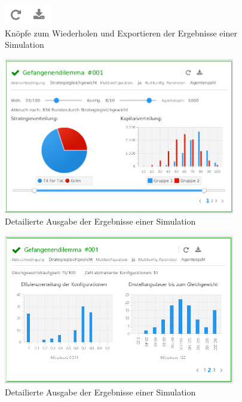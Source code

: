 \documentclass[parskip=full,11pt]{scrartcl}
\begin{document}
\begin{figure}[ht]
	\centering
	\includegraphics{images/out_btn.png}
	\caption{\label{fig:out_btn}
		Knöpfe zum Wiederholen und Exportieren der Ergebnisse einer Simulation}
\end{figure}
\begin{figure}[H]
	\centering
	\includegraphics[width=0.9\textwidth]{images/home_out_1.png}
	\caption{\label{fig:home_out_1}
		Detailierte Ausgabe der Ergebnisse einer Simulation}
\end{figure}
\begin{figure}[H]
	\centering
	\includegraphics[width=0.9\textwidth]{images/home_out_2.png}
	\caption{\label{fig:home_out_2}
		Detailierte Ausgabe der Ergebnisse einer Simulation}
\end{figure}
\end{document}
